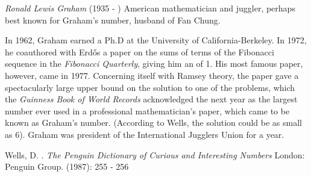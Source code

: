 \documentclass[12pt]{article}
\begin{document}
\emph{Ronald Lewis Graham} (1935 - ) American mathematician and juggler, perhaps best known for Graham's number, husband of Fan Chung.

In 1962, Graham earned a Ph.D at the University of California-Berkeley. In 1972, he coauthored with Erd\H{o}s a paper on the sums of terms of the Fibonacci sequence in the {\it Fibonacci Quarterly}, giving him an  of 1. His most famous paper, however, came in 1977. Concerning itself with Ramsey theory, the paper gave a spectacularly large upper bound on the solution to one of the problems, which the {\it Guinness Book of World Records} acknowledged the next year as the largest number ever used in a professional mathematician's paper, which came to be known as Graham's number. (According to Wells, the solution could be as small as 6). Graham was president of the International Jugglers Union for a year.

\begin{thebibliography}{1}
 Wells, D. . {\it The Penguin Dictionary of Curious and Interesting Numbers} London: Penguin Group. (1987): 255 - 256
\end{thebibliography}
\end{document}
